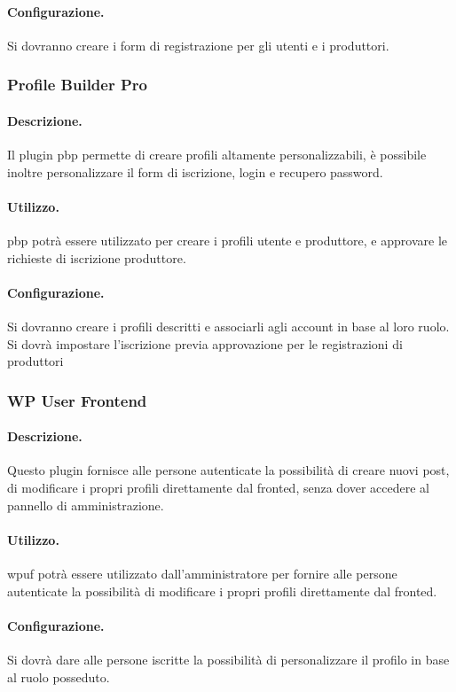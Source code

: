 \paragraph{Configurazione.}  Si dovranno creare i form di registrazione per gli utenti e i produttori.

\subsubsection{Profile Builder Pro}
\paragraph{Descrizione.} Il plugin \gls{pbp} permette di creare profili altamente personalizzabili, è possibile inoltre personalizzare il form di iscrizione, login e recupero password. 
\paragraph{Utilizzo.}  \gls{pbp} potrà essere utilizzato per creare i profili utente e produttore, e approvare le richieste di iscrizione produttore.
\paragraph{Configurazione.}  Si dovranno creare i profili descritti e associarli agli account in base al loro ruolo. Si dovrà impostare l'iscrizione previa approvazione per le registrazioni di produttori

\subsubsection{WP User Frontend}
\paragraph{Descrizione.} Questo plugin fornisce alle persone autenticate la possibilità di creare nuovi post, di modificare i propri profili direttamente dal fronted, senza dover accedere al pannello di amministrazione.
\paragraph{Utilizzo.}  \gls{wpuf} potrà essere utilizzato dall'amministratore per fornire alle persone autenticate la possibilità di modificare i propri profili direttamente dal fronted.
\paragraph{Configurazione.} Si dovrà dare alle persone iscritte la possibilità di personalizzare il profilo in base al ruolo posseduto.

